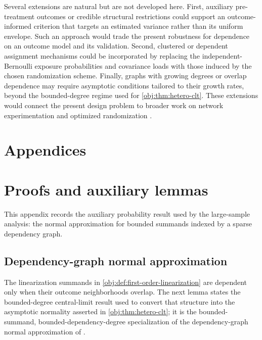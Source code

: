 \documentclass[11pt]{article}
\begin{document}
Several extensions are natural but are not developed here. First, auxiliary pre-treatment outcomes or credible structural restrictions could support an outcome-informed criterion that targets an estimated variance rather than its uniform envelope. Such an approach would trade the present robustness for dependence on an outcome model and its validation. Second, clustered or dependent assignment mechanisms could be incorporated by replacing the independent-Bernoulli exposure probabilities and covariance loads with those induced by the chosen randomization scheme. Finally, graphs with growing degrees or overlap dependence may require asymptotic conditions tailored to their growth rates, beyond the bounded-degree regime used for \cref{obj:thm:hetero-clt}. These extensions would connect the present design problem to broader work on network experimentation and optimized randomization \citep{UganderYin2020RandomizedGCR,Viviano2026NetworkDesign}.


\appendix

\section*{Appendices}

\section{Proofs and auxiliary lemmas}

This appendix records the auxiliary probability result used by the large-sample analysis: the normal approximation for bounded summands indexed by a sparse dependency graph.

\subsection{Dependency-graph normal approximation}

The linearization summands in \cref{obj:def:first-order-linearization} are dependent only when their outcome neighborhoods overlap. The next lemma states the bounded-degree central-limit result used to convert that structure into the asymptotic normality asserted in \cref{obj:thm:hetero-clt}; it is the bounded-summand, bounded-dependency-degree specialization of the dependency-graph normal approximation of \citet{BaldiRinott1989}.
\end{document}
